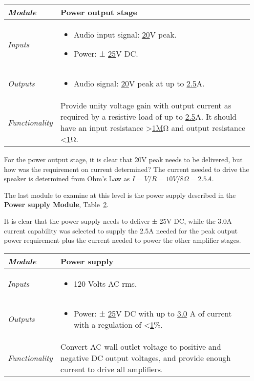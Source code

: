 \begin{table}[h]
\label{table:level1PowerOutputStage}
\begin{tabular}{|l|m{10cm}|}
\hline
\emph{Module} &
Power output stage  \\ \hline

\emph{Inputs} & 
\begin{itemize}
\item
  Audio input signal: \ul{20}V peak.
\item
  Power: ± \ul{25}V DC.
\end{itemize}\\ \hline
\emph{Outputs} & 
\begin{itemize}
\item
  Audio signal: \ul{20}V peak at up to \ul{2.5}A.
\end{itemize} \\ \hline
\emph{Functionality} & Provide unity voltage gain with output current as
required by a resistive load of up to \ul{2.5}A. It should have an input
resistance \textgreater{}\ul{1M}Ω and output resistance
\textless{}\ul{1}Ω. \\ \hline
\end{tabular}
\end{table}

For the power output stage, it is clear that 20V peak needs to be
delivered, but how was the requirement on current determined? The
current needed to drive the speaker is determined from Ohm's Law as
$I = V/R = 10V/8\Omega = 2.5A$.

The last module to examine at this level is the power supply described in
the \textbf{Power supply Module}, Table~\ref{table:level1PowerSupplyModule}.

It is clear that the power supply needs to deliver ± 25V DC, while the
3.0A current capability was selected to supply the 2.5A needed for the
peak output power requirement plus the current needed to power the other
amplifier stages.

\begin{table}[h]
\label{table:level1PowerSupplyModule}
\begin{tabular}{|l|m{10cm}|}
\hline
\emph{Module} & Power supply \\ \hline
\emph{Inputs} & 
\begin{itemize}
\item
  120 Volts AC rms.
\end{itemize} \\ \hline

\emph{Outputs} & 
\begin{itemize}
\item
  Power: ± \ul{25}V DC with up to \ul{3.0} A of current with a
  regulation of \textless{}\ul{1}\%.
\end{itemize}\\ \hline
\emph{Functionality} & Convert AC wall outlet voltage to positive and
negative DC output voltages, and provide enough current to drive all
amplifiers. \\ \hline
\end{tabular}
\end{table}

